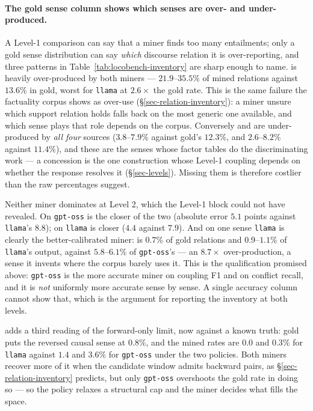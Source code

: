 \paragraph{The gold sense column shows which senses are over- and under-produced.} A Level-1 comparison
can say that a miner finds too many entailments; only a gold sense distribution can say \emph{which}
discourse relation it is over-reporting, and three patterns in Table~\ref{tab:locobench-inventory} are
sharp enough to name.  is heavily over-produced by both miners --- $21.9$--$35.5\%$ of
mined relations against $13.6\%$ in gold, worst for \texttt{llama} at $2.6\times$ the gold rate. This is
the same failure the factuality corpus shows as  over-use
(\S\ref{sec-relation-inventory}): a miner unsure which support relation holds falls back on the most
generic one available, and which sense plays that role depends on the corpus. Conversely
 and  are under-produced by \emph{all four} sources
($3.8$--$7.9\%$ against gold's $12.3\%$, and $2.6$--$8.2\%$ against $11.4\%$), and these are the senses
whose factor tables do the discriminating work --- a concession is the one construction whose Level-1
coupling depends on whether the response resolves it (\S\ref{sec-levels}). Missing them is therefore
costlier than the raw percentages suggest.

Neither miner dominates at Level 2, which the Level-1 block could not have revealed. On
 \texttt{gpt-oss} is the closer of the two (absolute error $5.1$ points against
\texttt{llama}'s $8.8$); on  \texttt{llama} is closer ($4.4$ against $7.9$). And on
one sense \texttt{llama} is clearly the better-calibrated miner:  is $0.7\%$ of gold
relations and $0.9$--$1.1\%$ of \texttt{llama}'s output, against $5.8$--$6.1\%$ of \texttt{gpt-oss}'s
--- an $8.7\times$ over-production, a sense it invents where the corpus barely uses it. This is the
qualification promised above: \texttt{gpt-oss} is the more accurate miner on coupling F1 and on conflict
recall, and it is \emph{not} uniformly more accurate sense by sense. A single accuracy column cannot show
that, which is the argument for reporting the inventory at both levels.

 adds a third reading of the forward-only limit, now against a known truth: gold puts
the reversed causal sense at $0.8\%$, and the mined rates are $0.0$ and $0.3\%$ for \texttt{llama}
against $1.4$ and $3.6\%$ for \texttt{gpt-oss} under the two policies. Both miners recover more of it
when the candidate window admits backward pairs, as \S\ref{sec-relation-inventory} predicts, but only
\texttt{gpt-oss} overshoots the gold rate in doing so --- so the policy relaxes a structural cap and the
miner decides what fills the space.

